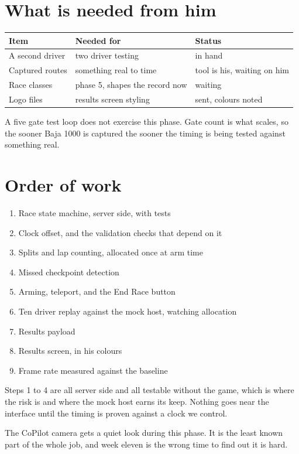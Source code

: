 \documentclass[11pt,a4paper]{article}
\begin{document}
\section{What is needed from him}

\begin{longtable}{@{}lll@{}}
\toprule
\textbf{Item} & \textbf{Needed for} & \textbf{Status} \\
\midrule
\endhead
A second driver  & two driver testing             & in hand \\
Captured routes & something real to time         & tool is his, waiting on him \\
Race classes    & phase 5, shapes the record now & waiting \\
Logo files      & results screen styling         & sent, colours noted \\
\bottomrule
\end{longtable}

A five gate test loop does not exercise this phase. Gate count is what scales,
so the sooner Baja 1000 is captured the sooner the timing is being tested
against something real.

\section{Order of work}

\begin{enumerate}
  \item Race state machine, server side, with tests
  \item Clock offset, and the validation checks that depend on it
  \item Splits and lap counting, allocated once at arm time
  \item Missed checkpoint detection
  \item Arming, teleport, and the End Race button
  \item Ten driver replay against the mock host, watching allocation
  \item Results payload
  \item Results screen, in his colours
  \item Frame rate measured against the baseline
\end{enumerate}

Steps 1 to 4 are all server side and all testable without the game, which is
where the risk is and where the mock host earns its keep. Nothing goes near the
interface until the timing is proven against a clock we control.

The CoPilot camera gets a quiet look during this phase. It is the least known
part of the whole job, and week eleven is the wrong time to find out it is
hard.
\end{document}
